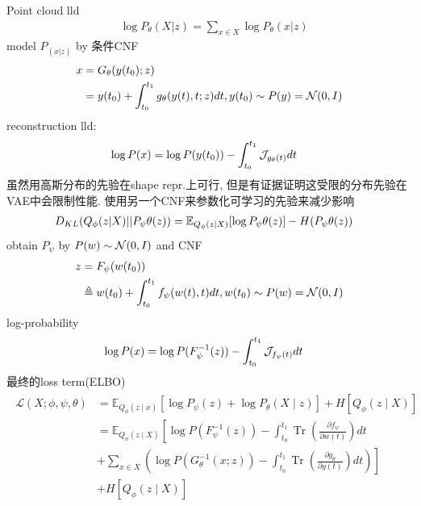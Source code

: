 \documentclass{article}
\begin{document}
    Point cloud lld
    \begin{align}
        &\log P_\theta(X|z) = \sum_{x\in X} \log P_\theta(x|z)
    \end{align}
    model $P_(x|z)$ by 条件CNF
    \begin{align}
        x 
        &= G_\theta(y(t_0);z)\\
        &=y(t_0) + \int^{t_1}_{t_0}g_\theta(y(t),t;z)dt, y(t_0) \sim P(y)=\cal N(0, I)
    \end{align}
    reconstruction lld:
    \begin{align}
        \log P(x) &= \log P(y(t_0)) - \int^{t_1}_{t_0}\cal J_{g_{\theta}(t)}dt 
    \end{align}
    虽然用高斯分布的先验在shape repr.上可行, 但是有证据证明这受限的分布先验在VAE中会限制性能. 使用另一个CNF来参数化可学习的先验来减少影响
    \begin{align}
        D_{KL}(Q_\phi(z|X)||P_\psi \theta(z)) &= 
        \bb E_{Q_\phi(z|X)}[\log P_\psi \theta(z)]- H(P_\psi \theta(z))
    \end{align}
    obtain $P_\psi$ by $P(w) \sim \cal N(0, I)$ and CNF
    \begin{align}
        z 
        &= F_\psi(w(t_0))\\
        &\triangleq w(t_0) + \int^{t_1}_{t_0}f_\psi(w(t),t)dt, w(t_0) \sim P(w)=\cal N(0, I)
    \end{align}
    log-probability
    \begin{align}
        \log P(x) &= \log P(F_\psi^{-1}(z)) - \int^{t_1}_{t_0}\cal J_{f_{\psi}(t)}dt 
    \end{align}
    最终的loss term(ELBO)
    \begin{align}
        \begin{aligned}
            \mathcal{L}(X ; \phi, \psi, \theta) &=\mathbb{E}_{Q_{\phi}(z \mid x)}\left[\log P_{\psi}(z)+\log P_{\theta}(X \mid z)\right]+H\left[Q_{\phi}(z \mid X)\right] \\
            &=\mathbb{E}_{Q_{\phi}(z \mid X)}\left[\log P\left(F_{\psi}^{-1}(z)\right)-\int_{t_{0}}^{t_{1}} \operatorname{Tr}\left(\frac{\partial f_{\psi}}{\partial w(t)}\right) d t\right.\\
            &\left.+\sum_{x \in X}\left(\log P\left(G_{\theta}^{-1}(x ; z)\right)-\int_{t_{0}}^{t_{1}} \operatorname{Tr}\left(\frac{\partial g_{\theta}}{\partial y(t)}\right) d t\right)\right] \\
            &+H\left[Q_{\phi}(z \mid X)\right]
        \end{aligned}
    \end{align}
\end{document}

